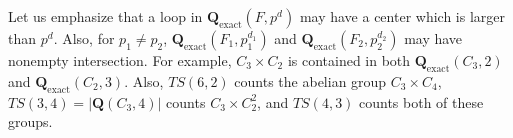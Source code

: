 \documentclass[12pt,a4paper]{amsart}
\newtheorem{proposition}[theorem]{Proposition}
\theoremstyle{definition}
\newcommand{\boldQ}{\mathbf{Q}}
\newcommand{\boldQexact}{\mathbf{Q}_{\mathrm{exact}}}
\begin{document}
Let us emphasize that a loop in $\boldQexact(F,p^{d})$ may have a center which is larger than $p^d$. Also, for $p_1\neq p_2$, $\boldQexact(F_1,p_1^{d_1})$ and $\boldQexact(F_2,p_2^{d_2})$ may have nonempty intersection. For example, $C_3\times C_2$ is contained in both $\boldQexact(C_3,2)$ and $\boldQexact(C_2,3)$. Also, $TS(6,2)$ counts the abelian group $C_3\times C_4$, $TS(3,4)=|\boldQ(C_3,4)|$ counts $C_3\times C_2^2$, and $TS(4,3)$ counts both of these groups. 



\end{document}
